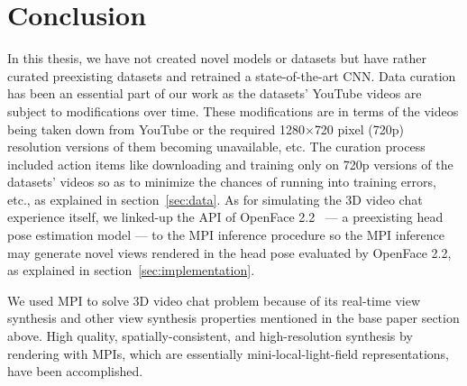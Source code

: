 \section{Conclusion}\label{sec:conclusion}

In this thesis, we have not created novel models or datasets but have rather curated preexisting datasets and retrained a state-of-the-art CNN. Data curation has been an essential part of our work as the datasets' YouTube videos are subject to modifications over time. These modifications are in terms of the videos being taken down from YouTube or the required 1280$\times$720 pixel (720p) resolution versions of them becoming unavailable, etc. The curation process included action items like downloading and training only on 720p versions of the datasets' videos so as to minimize the chances of running into training errors, etc., as explained in section~\ref{sec:data}. As for simulating the 3D video chat experience itself, we linked-up the API of OpenFace 2.2~\cite{baltrusaitis_openface_2018} --- a preexisting head pose estimation model --- to the MPI inference procedure so the MPI inference may generate novel views rendered in the head pose evaluated by OpenFace 2.2, as explained in section~\ref{sec:implementation}.

We used MPI to solve 3D video chat problem because of its real-time view synthesis and other view synthesis properties mentioned in the base paper section above. High quality, spatially-consistent, and high-resolution synthesis by rendering with MPIs, which are essentially mini-local-light-field representations, have been accomplished.
